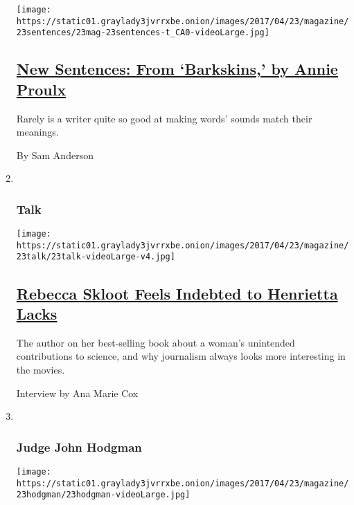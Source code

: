 \begin{enumerate}
  \texttt{[image: https://static01.graylady3jvrrxbe.onion/images/2017/04/23/magazine/23sentences/23mag-23sentences-t\_CA0-videoLarge.jpg]}

  \hypertarget{new-sentences-from-barkskins-by-annie-proulx}{%
  \subsection{\texorpdfstring{\href{/2017/04/18/magazine/new-sentences-from-barkskins-by-annie-proulx.html}{New
  Sentences: From `Barkskins,' by Annie
  Proulx}}{New Sentences: From `Barkskins,' by Annie Proulx}}\label{new-sentences-from-barkskins-by-annie-proulx}}

  Rarely is a writer quite so good at making words' sounds match their
  meanings.

  By Sam Anderson
\item ~
  \hypertarget{talk}{%
  \subsubsection{Talk}\label{talk}}

  \texttt{[image: https://static01.graylady3jvrrxbe.onion/images/2017/04/23/magazine/23talk/23talk-videoLarge-v4.jpg]}

  \hypertarget{rebecca-skloot-feels-indebted-to-henrietta-lacks}{%
  \subsection{\texorpdfstring{\href{/2017/04/19/magazine/rebecca-skloot-feels-indebted-to-henrietta-lacks.html}{Rebecca
  Skloot Feels Indebted to Henrietta
  Lacks}}{Rebecca Skloot Feels Indebted to Henrietta Lacks}}\label{rebecca-skloot-feels-indebted-to-henrietta-lacks}}

  The author on her best-selling book about a woman's unintended
  contributions to science, and why journalism always looks more
  interesting in the movies.

  Interview by Ana Marie Cox
\item ~
  \hypertarget{judge-john-hodgman}{%
  \subsubsection{Judge John Hodgman}\label{judge-john-hodgman}}

  \texttt{[image: https://static01.graylady3jvrrxbe.onion/images/2017/04/23/magazine/23hodgman/23hodgman-videoLarge.jpg]}


\end{enumerate}
